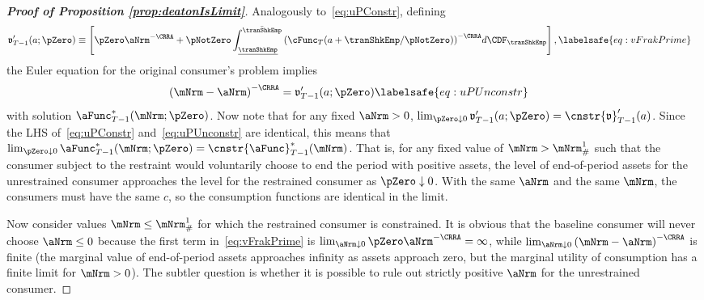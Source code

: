 \documentclass[\econtexRoot/BufferStockTheory]{subfiles}
\begin{document}
\begin{proof}[\textbf{Proof of Proposition \ref{prop:deatonIsLimit}}]
Analogously to~\eqref{eq:uPConstr}, defining
\begin{equation}\begin{gathered}\begin{aligned}
      \mathfrak{v}_{T-1}^{\prime}(a;\pZero)  & \equiv  \left[\pZero \aNrm^{-\CRRA}+\pNotZero\int_{\underline{\tranShkEmp}}^{\bar{\tranShkEmp}} {\left(\cFunc_{T}(a+\tranShkEmp/\pNotZero)\right)}^{-\CRRA} d\CDF_{\tranShkEmp}\right], \labelsafe{eq:vFrakPrime}
    \end{aligned}\end{gathered}\end{equation}
the Euler equation for the original consumer's problem implies
\begin{equation}\begin{gathered}\begin{aligned}
      {(\mNrm-\aNrm)}^{-\CRRA}  & = \mathfrak{v}_{T-1}^{\prime}(a;\pZero) \labelsafe{eq:uPUnconstr}
    \end{aligned}\end{gathered}\end{equation}
with solution $\aFunc_{T-1}^{*}(\mNrm;\pZero)$.
Now note that for any fixed $\aNrm>0$, $\lim_{\pZero \downarrow 0} \mathfrak{v}_{T-1}^{\prime}(a;\pZero) = \cnstr{\mathfrak{v}}_{T-1}^{\prime}(a)$.
Since the LHS of~\eqref{eq:uPConstr} and~\eqref{eq:uPUnconstr} are identical, this means that $\lim_{\pZero \downarrow 0} \aFunc_{T-1}^{*}(\mNrm;\pZero) = \cnstr{\aFunc}_{T-1}^{*}(\mNrm)$.
That is, for any fixed value of $\mNrm > \mNrm^{1}_{\#}$ such that the consumer subject to the restraint would voluntarily choose to end the period with positive assets, the level of end-of-period assets for the unrestrained consumer approaches the level for the restrained consumer as $\pZero \downarrow 0$.
With the same $\aNrm$ and the same $\mNrm$, the consumers must have the same $c$, so the consumption functions are identical in the limit.

Now consider values $\mNrm\leq \mNrm^{1}_{\#}$ for which the restrained consumer is constrained.
It is obvious that the baseline consumer will never choose $\aNrm \leq 0$ because the first term in~\eqref{eq:vFrakPrime} is $\lim_{\aNrm \downarrow 0} \pZero \aNrm^{-\CRRA} = \infty$, while $\lim_{\aNrm \downarrow 0} {(\mNrm-\aNrm)}^{-\CRRA}$ is finite (the marginal value of end-of-period assets approaches infinity as assets approach zero, but the marginal utility of consumption has a finite limit for $\mNrm>0$).
The subtler question is whether it is possible to rule out strictly positive $\aNrm$ for the unrestrained consumer.


\end{proof}
\end{document}
